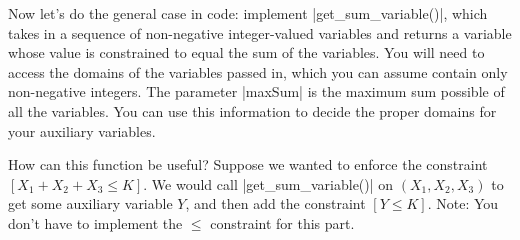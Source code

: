 \item {}
Now let's do the general case in code: implement |get_sum_variable()|, which
takes in a sequence of non-negative integer-valued variables and returns a
variable whose value is constrained to equal the sum of the variables. You will
need to access the domains of the variables passed in, which you can assume
contain only non-negative integers. The parameter |maxSum| is the maximum sum
possible of all the variables. You can use this information to decide the proper
domains for your auxiliary variables.

How can this function be useful? Suppose we wanted to enforce the constraint
$[X_1 + X_2 + X_3 \le K]$. We would call |get_sum_variable()| on $(X_1,X_2,X_3)$
to get some auxiliary variable $Y$, and then add the constraint $[Y \le K]$.
Note: You don't have to implement the $\le$ constraint for this part.
